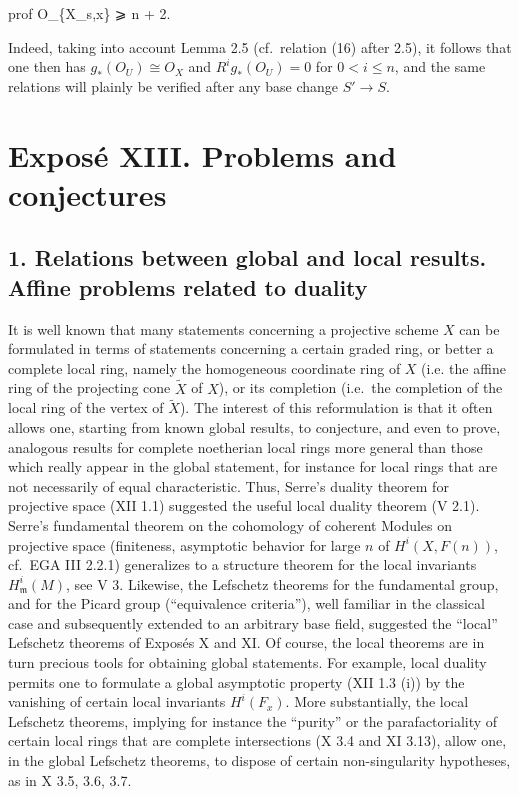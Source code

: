 \documentclass[
]{article}
\newenvironment{Shaded}{}{}
\newcommand{\NormalTok}[1]{#1}
\begin{document}
\begin{enumerate}
\begin{Shaded}
\begin{Highlighting}[]
\NormalTok{prof O\_\{X\_s,x\} ⩾ n + 2.}
\end{Highlighting}
\end{Shaded}

  Indeed, taking into account Lemma 2.5 (cf.~relation (16) after 2.5),
  it follows that one then has \(g_{\ast}(O_{U}) \cong O_{X}\) and
  \(R^{i}g_{\ast}(O_{U}) = 0\) for \(0 < i \leqslant n\), and the same
  relations will plainly be verified after any base change \(S' \to S\).
\end{enumerate}

\section{Exposé XIII. Problems and
conjectures}\label{exposuxe9-xiii.-problems-and-conjectures}

\subsection{1. Relations between global and local results. Affine
problems related to
duality}\label{relations-between-global-and-local-results.-affine-problems-related-to-duality}

It is well known that many statements concerning a projective scheme
\(X\) can be formulated in terms of statements concerning a certain
graded ring, or better a complete local ring, namely the homogeneous
coordinate ring of \(X\) (i.e. the affine ring of the projecting cone
\(\tilde{X}\) of \(X\)), or its completion (i.e.~the completion of the
local ring of the vertex of \(\tilde{X}\)). The interest of this
reformulation is that it often allows one, starting from known global
results, to conjecture, and even to prove, analogous results for
complete noetherian local rings more general than those which really
appear in the global statement, for instance for local rings that are
not necessarily of equal characteristic. Thus, Serre's duality theorem
for projective space (XII 1.1) suggested the useful local duality
theorem (V 2.1). Serre's fundamental theorem on the cohomology of
coherent Modules on projective space (finiteness, asymptotic behavior
for large \(n\) of \(H^{i}(X, F(n))\), cf.~EGA III 2.2.1) generalizes to
a structure theorem for the local invariants
\(H^{i}_{\mathfrak{m}}(M)\), see V 3. Likewise, the Lefschetz theorems
for the fundamental group, and for the Picard group (``equivalence
criteria''), well familiar in the classical case and subsequently
extended to an arbitrary base field, suggested the ``local'' Lefschetz
theorems of Exposés X and XI. Of course, the local theorems are in turn
precious tools for obtaining global statements. For example, local
duality permits one to formulate a global asymptotic property (XII 1.3
(i)) by the vanishing of certain local invariants \(H^{i}(F_{x})\). More
substantially, the local Lefschetz theorems, implying for instance the
``purity'' or the parafactoriality of certain local rings that are
complete intersections (X 3.4 and XI 3.13), allow one, in the global
Lefschetz theorems, to dispose of certain non-singularity hypotheses, as
in X 3.5, 3.6, 3.7.
\end{document}
